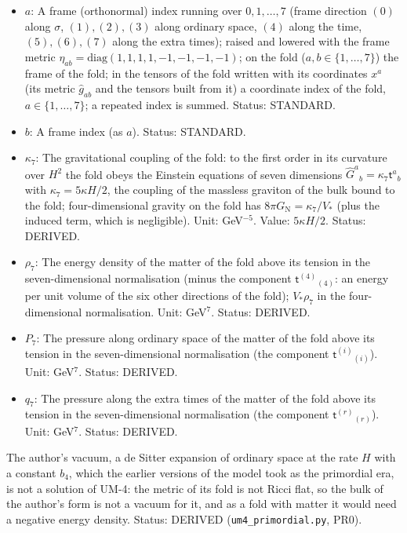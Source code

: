 \documentclass[
  10pt,
]{article}
\begin{document}
\begin{itemize}
  the four-dimensional metric \(\hat h_{\mu\nu}\). Unit: 1/length\(^2\).
  Status: STANDARD.
\item
  \(a\): A frame (orthonormal) index running over \(0, 1, \dots, 7\)
  (frame direction \((0)\) along \(\sigma\), \((1), (2), (3)\) along
  ordinary space, \((4)\) along the time, \((5), (6), (7)\) along the
  extra times); raised and lowered with the frame metric
  \(\eta_{ab} = \mathrm{diag}(1, 1, 1, 1, -1, -1, -1, -1)\); on the fold
  (\(a, b \in \{1, \dots, 7\}\)) the frame of the fold; in the tensors
  of the fold written with its coordinates \(x^a\) (its metric
  \(\hat g_{ab}\) and the tensors built from it) a coordinate index of
  the fold, \(a \in \{1, \dots, 7\}\); a repeated index is summed.
  Status: STANDARD.
\item
  \(b\): A frame index (as \(a\)). Status: STANDARD.
\item
  \(\kappa_7\): The gravitational coupling of the fold: to the first
  order in its curvature over \(H^2\) the fold obeys the Einstein
  equations of seven dimensions
  \(\hat G^a{}_b = \kappa_7\mathsf{t}^a{}_b\) with
  \(\kappa_7 = 5\kappa H/2\), the coupling of the massless graviton of
  the bulk bound to the fold; four-dimensional gravity on the fold has
  \(8\pi G_{\mathrm{N}} = \kappa_7/V_*\) (plus the induced term, which
  is negligible). Unit: GeV\(^{-5}\). Value: \(5\kappa H/2\). Status:
  DERIVED.
\item
  \(\rho_7\): The energy density of the matter of the fold above its
  tension in the seven-dimensional normalisation (minus the component
  \(\mathsf{t}^{(4)}{}_{(4)}\): an energy per unit volume of the six
  other directions of the fold); \(V_*\rho_7\) in the four-dimensional
  normalisation. Unit: GeV\(^7\). Status: DERIVED.
\item
  \(P_7\): The pressure along ordinary space of the matter of the fold
  above its tension in the seven-dimensional normalisation (the
  component \(\mathsf{t}^{(i)}{}_{(i)}\)). Unit: GeV\(^7\). Status:
  DERIVED.
\item
  \(q_7\): The pressure along the extra times of the matter of the fold
  above its tension in the seven-dimensional normalisation (the
  component \(\mathsf{t}^{(r)}{}_{(r)}\)). Unit: GeV\(^7\). Status:
  DERIVED.
\end{itemize}

The author's vacuum, a de Sitter expansion of ordinary space at the rate
\(H\) with a constant \(b_4\), which the earlier versions of the model
took as the primordial era, is not a solution of UM-4: the metric of its
fold is not Ricci flat, so the bulk of the author's form is not a vacuum
for it, and as a fold with matter it would need a negative energy
density. Status: DERIVED (\texttt{um4\_primordial.py}, PR0).
\end{document}

